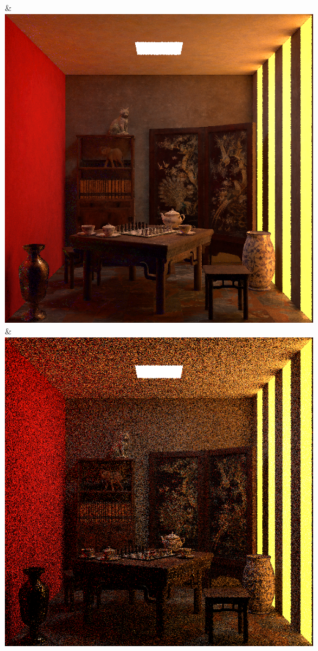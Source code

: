 & \includegraphics[width=\linewidth]{figures/py/tests/quality_comparison/nrc+sppc_1spp_chess.png}
& \includegraphics[width=\linewidth]{figures/py/tests/quality_comparison/sppm_1spp_chess.png}
